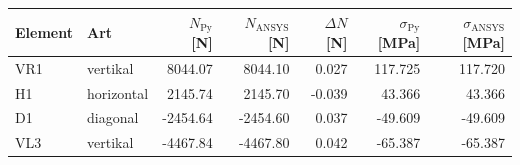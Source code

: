 \begin{tabular}{llrrrrr}
\toprule
Element & Art & $N_\mathrm{Py}$ [N] & $N_\mathrm{ANSYS}$ [N] & $\Delta N$ [N] & $\sigma_\mathrm{Py}$ [MPa] & $\sigma_\mathrm{ANSYS}$ [MPa]\\
\midrule
VR1 & vertikal & 8044.07 & 8044.10 & 0.027 & 117.725 & 117.720\\
H1 & horizontal & 2145.74 & 2145.70 & -0.039 & 43.366 & 43.366\\
D1 & diagonal & -2454.64 & -2454.60 & 0.037 & -49.609 & -49.609\\
VL3 & vertikal & -4467.84 & -4467.80 & 0.042 & -65.387 & -65.387\\
\bottomrule
\end{tabular}

